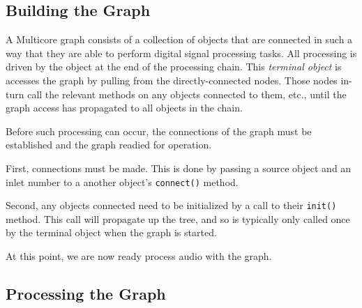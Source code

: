 \documentclass[twoside,a4paper]{article}
\begin{document}


\subsection{Building the Graph} %

A Multicore graph consists of a collection of objects that are connected in such a way that they are able to perform digital signal processing tasks.  All processing is driven by the object at the end of the processing chain.  This \emph{terminal object} is accesses the graph by pulling from the directly-connected nodes.  Those nodes in-turn call the relevant methods on any objects connected to them, etc., until the graph access has propagated to all objects in the chain.

Before such processing can occur, the connections of the graph must be established and the graph readied for operation.  

First, connections must be made.  This is done by passing a source object and an inlet number to a another object's \texttt{connect()} method.  

Second, any objects connected need to be initialized by a call to their \texttt{init()} method.  This call will propagate up the tree, and so is typically only called once by the terminal object when the graph is started.  


At this point, we are now ready process audio with the graph.


%
% 
% 




\subsection{Processing the Graph} %
\end{document}
